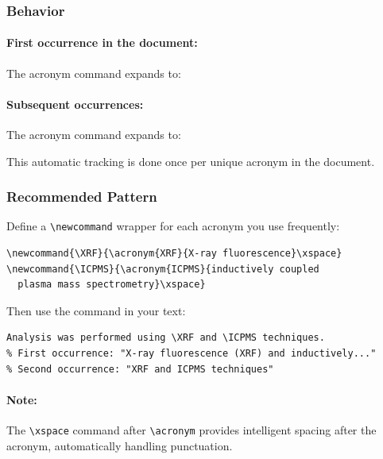 \documentclass[11pt]{article}
\begin{document}
\subsubsection{Behavior}

\paragraph{First occurrence in the document:}

The acronym command expands to:

\begin{center}
\end{center}

\paragraph{Subsequent occurrences:}

The acronym command expands to:

\begin{center}
\end{center}

This automatic tracking is done once per unique acronym in the document.

\subsubsection{Recommended Pattern}

Define a \verb|\newcommand| wrapper for each acronym you use frequently:

\begin{verbatim}
\newcommand{\XRF}{\acronym{XRF}{X-ray fluorescence}\xspace}
\newcommand{\ICPMS}{\acronym{ICPMS}{inductively coupled 
  plasma mass spectrometry}\xspace}
\end{verbatim}

Then use the command in your text:

\begin{verbatim}
Analysis was performed using \XRF and \ICPMS techniques.
% First occurrence: "X-ray fluorescence (XRF) and inductively..."
% Second occurrence: "XRF and ICPMS techniques"
\end{verbatim}

\paragraph{Note:} The \verb|\xspace| command after \verb|\acronym| provides intelligent spacing 
after the acronym, automatically handling punctuation.
\end{document}

